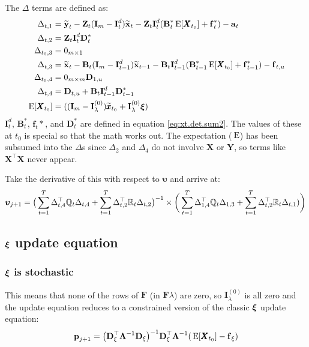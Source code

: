 \documentclass[]{article}
\def\uupsilon{\pmb{\upsilon}}
\def\xixi{\mbox{\boldmath $\xi$}}
\def\LAM{\mbox{\boldmath $\Lambda$}}
\def\ZZ{\mbox{$\mathbf Z$}}	\def\zz{\mbox{$\mathbf z$}}
\def\BB{\mbox{$\mathbf B$}}	\def\bb{\mbox{$\mathbf b$}}
\def\DD{\mbox{$\mathbf D$}}	\def\dd{\mbox{$\mathbf d$}}
\def\FF{\mbox{$\mathbf F$}} \def\ff{\mbox{$\mathbf f$}}
\def\II{\mbox{$\mathbf I$}} \def\ii{\mbox{$\mathbf i$}}
\def\XX{\mbox{$\pmb{X}$}}	\def\xx{\mbox{$\pmb{x}$}}
\def\YY{\mbox{$\pmb{Y}$}}	\def\yy{\mbox{$\pmb{y}$}}
\def\E{\,\textup{\textrm{E}}}
\def\hatxt{\widetilde{\mbox{$\mathbf x$}}_t}
\def\hatxtm{\widetilde{\mbox{$\mathbf x$}}_{t-1}}
\def\hatyt{\widetilde{\mbox{$\mathbf y$}}_t}
\begin{document}
The $\Delta$ terms are defined as:
\begin{equation}\label{eq:degen.u.update.Deltas}
\begin{split}
\Delta_{t,1}&=\hatyt - \ZZ_t(\II_m - \II_t^d)\hatxt - \ZZ_t\II_t^{d}(\BB^*_t\E[\XX_{t_0}] + \ff^*_t) - \aa_t \\
\Delta_{t,2}&= \ZZ_t\II_t^{d}\DD^*_t \\
\Delta_{t_0,3}&=0_{m\times 1} \\
\Delta_{t,3}&=\hatxt - \BB_t(\II_m - \II_{t-1}^d)\hatxtm - \BB_t\II_{t-1}^{d}(\BB^*_{t-1} \E[\XX_{t_0}] + \ff^*_{t-1}) - \ff_{t,u} \\
\Delta_{t_0,4}&=0_{m\times m} \DD_{1,u} \\
\Delta_{t,4}&=\DD_{t,u}+\BB_t\II_{t-1}^{d}\DD^*_{t-1} \\
\E[\XX_{t_0}]&=((\II_m-\II_\lambda^{(0)})\widetilde{\xx}_{t_0}+\II_\lambda^{(0)} \xixi)
\end{split}
\end{equation}
$\II^d_t$, $\BB_t^*$, $\ff_t*$, and $\DD_t^*$ are defined in equation \ref{eq:xt.det.sum2}.  The values of these at $t_0$ is special so that the math works out. The expectation ($\E$) has been subsumed into the $\Delta$s since $\Delta_2$ and $\Delta_4$ do not involve $\XX$ or $\YY$, so terms like $\XX^\top\XX$ never appear.

Take the derivative of this with respect to $\uupsilon$ and arrive at:
\begin{equation}
\begin{split}
\label{eq:p.degen.update.u}
\uupsilon_{j+1} = \big(\sum_{t=1}^T\Delta_{t,4}^\top\Qm_t\Delta_{t,4} + \sum_{t=1}^T\Delta_{t,2}^\top\Rm_t\Delta_{t,2}\big)^{-1} \times
 \bigg(\sum_{t=1}^T\Delta_{1,4}^\top\Qm_t\Delta_{1,3} + \sum_{t=1}^T \Delta_{t,2}^\top\Rm_t\Delta_{t,1})\bigg)
\end{split}
\end{equation}

\subsection{$\xixi$ update equation}

\subsubsection{$\xixi$ is stochastic}
This means that none of the rows of $\FF$ (in $\FF\lambda$)  are zero, so $\II_\lambda^{(0)}$ is all zero and the update equation reduces to a constrained version of the classic $\xixi$ update equation:
\begin{equation}
\label{eq:p.degen.update.x0.0.a}
\pp_{j+1} = \big(\DD_\xi^\top\LAM^{-1}\DD_\xi\big)^{-1}\DD_\xi^\top\LAM^{-1}(\E[\XX_{t_0}] - \ff_\xi)
\end{equation}
\end{document}
